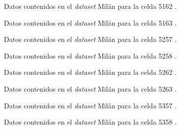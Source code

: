\begin{figure}[h!]
	\centering
	
	\caption{Datos contenidos en el \textit{dataset} Milán para la celda 5162 \cite{milandataset}.}
	\label{5162}
\end{figure}
\FloatBarrier

\begin{figure}[h!]
	\centering
	
	\caption{Datos contenidos en el \textit{dataset} Milán para la celda 5163 \cite{milandataset}.}
	\label{5163}
\end{figure}
\FloatBarrier

\begin{figure}[h!]
	\centering
	
	\caption{Datos contenidos en el \textit{dataset} Milán para la celda 5257 \cite{milandataset}.}
	\label{5257}
\end{figure}
\FloatBarrier

\begin{figure}[h!]
	\centering
	
	\caption{Datos contenidos en el \textit{dataset} Milán para la celda 5258 \cite{milandataset}.}
	\label{5258}
\end{figure}
\FloatBarrier

\begin{figure}[h!]
	\centering
	
	\caption{Datos contenidos en el \textit{dataset} Milán para la celda 5262 \cite{milandataset}.}
	\label{5262}
\end{figure}
\FloatBarrier

\begin{figure}[h!]
	\centering
	
	\caption{Datos contenidos en el \textit{dataset} Milán para la celda 5263 \cite{milandataset}.}
	\label{5263}
\end{figure}
\FloatBarrier

\begin{figure}[h!]
	\centering
	
	\caption{Datos contenidos en el \textit{dataset} Milán para la celda 5357 \cite{milandataset}.}
	\label{5357}
\end{figure}
\FloatBarrier

\begin{figure}[h!]
	\centering
	
	\caption{Datos contenidos en el \textit{dataset} Milán para la celda 5358 \cite{milandataset}.}
	\label{5358}
\end{figure}
\FloatBarrier


